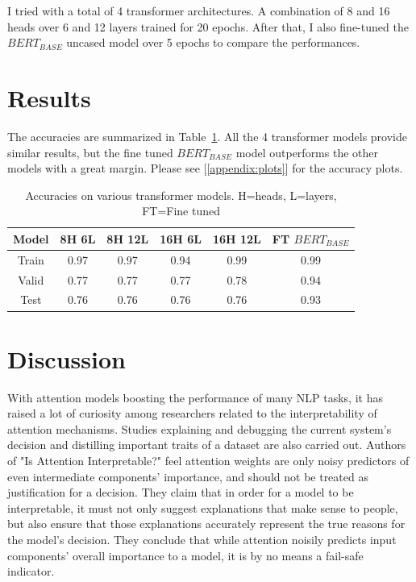 \documentclass{article}
\begin{document}
I tried with a total of 4 transformer architectures. A combination of 8 and 16 heads over 6 and 12 layers trained for 20 epochs.
After that, I also fine-tuned the $BERT_{BASE}$ uncased model over 5 epochs to compare the performances.

\section{Results}

The accuracies are summarized in Table~\ref{accuracies-table}. All the 4 transformer models provide similar results, but the fine tuned $BERT_{BASE}$ model outperforms the other models with a great margin. Please see [\ref{appendix:plots}] for the accuracy plots.

\begin{table}
  \caption{Accuracies on various transformer models. H=heads, L=layers, FT=Fine tuned}
  \label{accuracies-table}
  \centering
  \begin{tabular}{cccccc}
    \toprule
    \cmidrule(r){1-2}
    Model     & 8H 6L    & 8H 12L  & 16H 6L  & 16H 12L  & FT $BERT_{BASE}$  \\
    \midrule
    Train & 0.97 & 0.97 & 0.94 & 0.99 & 0.99  \\
    Valid & 0.77 & 0.77 & 0.77 & 0.78 & 0.94  \\
    Test & 0.76 & 0.76 & 0.76 & 0.76 & 0.93  \\
    \bottomrule
  \end{tabular}
\end{table}



\section{Discussion}

With attention models boosting the performance of many NLP tasks, it has raised a lot of curiosity among researchers related to the interpretability of attention mechanisms. Studies explaining and debugging the current system's decision \cite{lee-etal-2017-interactive} and  distilling important traits of a dataset \cite{yang-etal-2017-satirical} are also carried out. Authors of "Is Attention Interpretable?" \cite{serrano2019attention} feel attention weights are only noisy predictors of even intermediate components' importance, and should not be treated as justification for a decision. They claim that in order for a model to be interpretable, it must not only suggest explanations that make sense to people, but also ensure that those explanations accurately represent the true reasons for the model's decision. They conclude that while attention noisily predicts input components' overall importance to a model, it is by no means a fail-safe indicator. 
\end{document}
